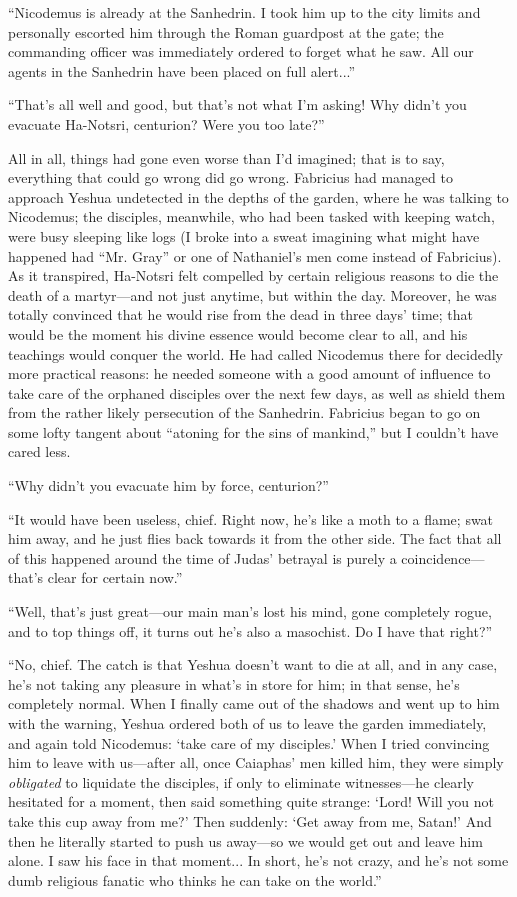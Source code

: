 ``Nicodemus is already at the Sanhedrin. I took him up to the city limits and personally escorted him through the Roman guardpost at the gate; the commanding officer was immediately ordered to forget what he saw. All our agents in the Sanhedrin have been placed on full alert...''

``That's all well and good, but that's not what I'm asking! Why didn't you evacuate Ha-Notsri, centurion? Were you too late?''

All in all, things had gone even worse than I'd imagined; that is to say, everything that could go wrong did go wrong. Fabricius had managed to approach Yeshua undetected in the depths of the garden, where he was talking to Nicodemus; the disciples, meanwhile, who had been tasked with keeping watch, were busy sleeping like logs (I broke into a sweat imagining what might have happened had ``Mr. Gray'' or one of Nathaniel's men come instead of Fabricius). As it transpired, Ha-Notsri felt compelled by certain religious reasons to die the death of a martyr---and not just anytime, but within the day. Moreover, he was totally convinced that he would rise from the dead in three days' time; that would be the moment his divine essence would become clear to all, and his teachings would conquer the world. He had called Nicodemus there for decidedly more practical reasons: he needed someone with a good amount of influence to take care of the orphaned disciples over the next few days, as well as shield them from the rather likely persecution of the Sanhedrin. Fabricius began to go on some lofty tangent about ``atoning for the sins of mankind,'' but I couldn't have cared less.

``Why didn't you evacuate him by force, centurion?''

``It would have been useless, chief. Right now, he's like a moth to a flame; swat him away, and he just flies back towards it from the other side. The fact that all of this happened around the time of Judas' betrayal is purely a coincidence---that's clear for certain now.''

``Well, that's just great---our main man's lost his mind, gone completely rogue, and to top things off, it turns out he's also a masochist. Do I have that right?''

``No, chief. The catch is that Yeshua doesn't want to die at all, and in any case, he's not taking any pleasure in what's in store for him; in that sense, he's completely normal. When I finally came out of the shadows and went up to him with the warning, Yeshua ordered both of us to leave the garden immediately, and again told Nicodemus: `take care of my disciples.' When I tried convincing him to leave with us---after all, once Caiaphas' men killed him, they were simply \emph{obligated} to liquidate the disciples, if only to eliminate witnesses---he clearly hesitated for a moment, then said something quite strange: `Lord! Will you not take this cup away from me?' Then suddenly: `Get away from me, Satan!' And then he literally started to push us away---so we would get out and leave him alone. I saw his face in that moment... In short, he's not crazy, and he's not some dumb religious fanatic who thinks he can take on the world.''


